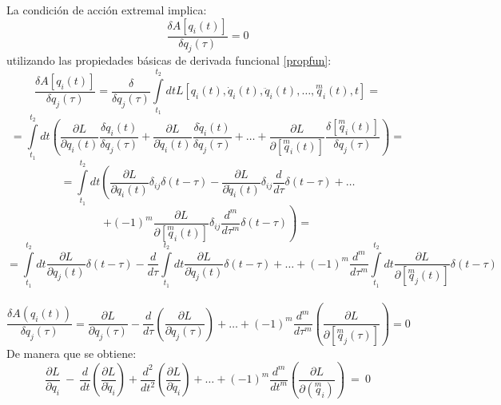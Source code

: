 \documentclass[a4paper,12pt]{article}
\begin{document}
La condición de acción extremal implica:
\begin{equation}
\frac{\delta A[q_i(t)]}{\delta q_j(\tau)}=0 
\end{equation}
utilizando las propiedades básicas de derivada funcional \eqref{propfun}:
\begin{equation}
\frac{\delta A[q_i(t)]}{\delta q_j(\tau)}=\frac{\delta}{\delta q_j(\tau)}\int\limits_{t_1}^{t_2}dtL[q_i(t),\dot q_i(t),\ddot q_i(t),\dotso,\overset{m}{q}_i(t),t]=
\end{equation}
\begin{equation}
=\int\limits_{t_1}^{t_2}dt\left(\frac{\partial L}{\partial q_i(t)}\frac{\delta q_i(t)}{\delta q_j(\tau)}+\frac{\partial L}{\partial \dot q_i(t)}\frac{\delta \dot q_i(t)}{\delta q_j(\tau)}+\dotso+\frac{\partial L}{\partial [\overset{m}{q}_i(t)]}\frac{\delta [\overset{m}{q}_i(t)]}{\delta {q}_j(\tau)}  \right)=
\end{equation}
\begin{equation}
=\int\limits_{t_1}^{t_2}dt\left(\frac{\partial L}{\partial q_i(t)}\delta_{ij} \delta(t-\tau)-\frac{\partial L}{\partial \dot q_i(t)}\delta_{ij} \frac{d}{d\tau}\delta(t-\tau)+\dotso\right. 
\end{equation}
$$+\left.(-1)^m\frac{\partial L}{\partial [\overset{m}{q}_i(t)]}\delta_{ij} \frac{d^m}{d\tau^m}\delta(t-\tau)  \right)=$$
{\small
\begin{equation}
=\int\limits_{t_1}^{t_2}dt\frac{\partial L}{\partial q_j(t)}\delta(t-\tau)-\frac{d}{d\tau}\int\limits_{t_1}^{t_2}dt\frac{\partial L}{\partial \dot q_j(t)}\delta(t-\tau)+\dotso+(-1)^m\frac{d^m}{d\tau^m}\int\limits_{t_1}^{t_2}dt\frac{\partial L}{\partial [\overset{m}{q}_j(t)]} \delta(t-\tau) 
\end{equation}}\\
\begin{equation}
\frac{\delta A(q_i(t))}{\delta q_j(\tau)}=\frac{\partial L}{\partial q_j(\tau)} -\frac{d}{d\tau}\left(\frac{\partial L}{\partial \dot q_j(\tau)}\right)+\dotso+(-1)^m\frac{d^m}{d\tau^m}\left(\frac{\partial L}{\partial [\overset{m}{q}_j(\tau)]}\right)=0 
\end{equation}
De manera que se obtiene:
\begin{equation}
\frac{\partial L}{\partial q_i} \ -\  \frac{d}{dt}\left(\frac{\partial L}{\partial \dot q_i}\right)+\frac{d^2}{dt^2}\left(\frac{\partial L}{\partial \ddot q_i}\right)+\dotso+(-1)^m\frac{d^m}{dt^m}\left(\frac{\partial L}{\partial (\overset{m}{q}_i)}\right)\ =\ 0
\end{equation}
\vspace{0,4cm}
\end{document}
